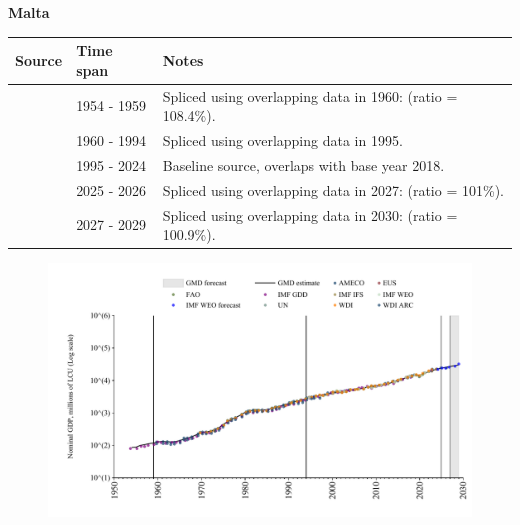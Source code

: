 \documentclass[12pt,a4paper,landscape]{article}
\begin{document}
\begin{adjustbox}{max totalsize={\paperwidth}{\paperheight},center}
\begin{minipage}[t][\textheight][t]{\textwidth}
\vspace*{0.5cm}
{}
\begin{center}
{\Large\bfseries Malta}
\end{center}
\vspace{0.5cm}
\begin{table}[H]
\centering
\small
\begin{tabular}{|l|l|l|}
\hline
\textbf{Source} & \textbf{Time span} & \textbf{Notes} \\
\hline
\rowcolor{white}\cite{IMF_GDD}& 1954 - 1959 &Spliced using overlapping data in 1960: (ratio = 108.4\%).\\
\rowcolor{lightgray}\cite{AMECO}& 1960 - 1994 &Spliced using overlapping data in 1995.\\
\rowcolor{white}\cite{EUS}& 1995 - 2024 &Baseline source, overlaps with base year 2018.\\
\rowcolor{lightgray}\cite{AMECO}& 2025 - 2026 &Spliced using overlapping data in 2027: (ratio = 101\%).\\
\rowcolor{white}\cite{IMF_WEO_forecast}& 2027 - 2029 &Spliced using overlapping data in 2030: (ratio = 100.9\%).\\
\hline
\end{tabular}
\end{table}
\begin{figure}[H]
\centering
\includegraphics[width=\textwidth,height=0.6\textheight,keepaspectratio]{graphs/MLT_nGDP.pdf}
\end{figure}
\end{minipage}
\end{adjustbox}
\end{document}
